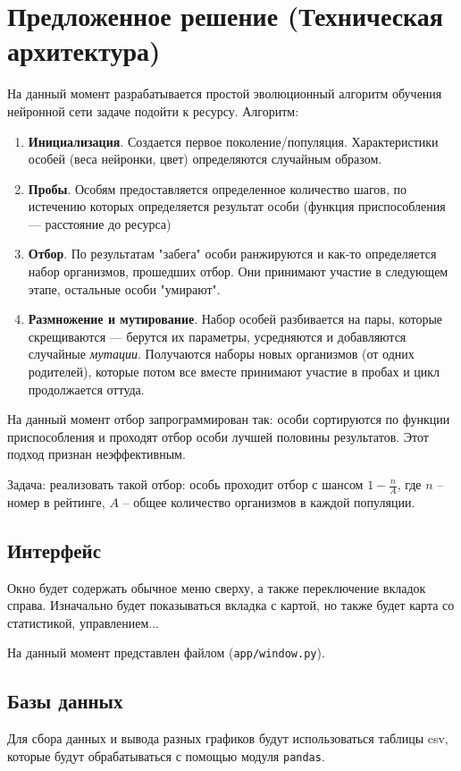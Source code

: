 \documentclass[12pt,a4paper, titlepage]{article}
\begin{document}
\section{Предложенное решение (Техническая архитектура)}
На данный момент разрабатывается простой эволюционный алгоритм обучения нейронной сети задаче подойти к ресурсу.
Алгоритм:
	\begin{enumerate}
		\item \textbf{Инициализация}. 
		Создается первое поколение/популяция.
		Характеристики особей (веса нейронки, цвет) определяются случайным образом.
		\item \textbf{Пробы}.
		Особям предоставляется определенное количество шагов, по истечению которых определяется результат особи (функция приспособления --- расстояние до ресурса)
		\item \textbf{Отбор}.
		По результатам "забега" особи ранжируются и как-то определяется набор организмов, прошедших отбор.
		Они принимают участие в следующем этапе, остальные особи "умирают".
		\item \textbf{Размножение и мутирование}.
		Набор особей разбивается на пары, которые скрещиваются --- берутся их параметры, усредняются и добавляются случайные \textit{мутации}.
		Получаются наборы новых организмов (от одних родителей), которые потом все вместе принимают участие в пробах и цикл продолжается оттуда.  
\end{enumerate}
		
На данный момент отбор запрограммирован так: особи сортируются по функции приспособления и проходят отбор особи лучшей половины результатов. 
Этот подход признан неэффективным.

Задача: реализовать такой отбор: особь проходит отбор с шансом $1 - \frac{n}{A}$, где $n$ -- номер в рейтинге, $A$ -- общее количество организмов в каждой популяции. 
	  
\subsection{Интерфейс}
Окно будет содержать обычное меню сверху, а также переключение вкладок справа. Изначально будет показываться вкладка с картой, но также будет карта со статистикой, управлением...

На данный момент представлен файлом ({\tt app/window.py}).

\subsection{Базы данных}
Для сбора данных и вывода разных графиков будут использоваться таблицы csv, которые будут обрабатываться с помощью модуля {\tt pandas}.
\end{document}

